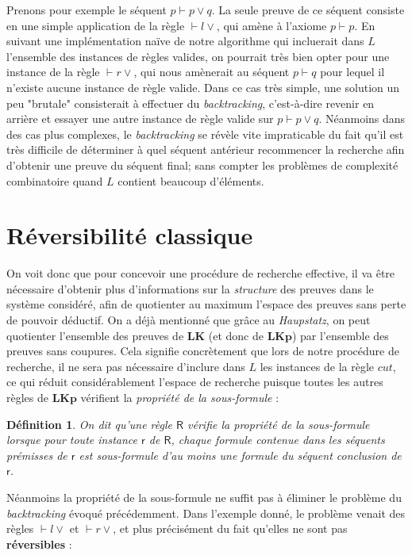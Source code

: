 \documentclass[12pt]{report}
\newcommand{\seq}{\vdash}
\newcommand{\irule}[1]{\footnotesize$#1$}
\newcommand{\iruleR}[1]{\irule{\seq{#1}}}
\newtheorem{definition}{Définition}
\begin{document}
Prenons pour exemple le séquent $p \seq p \lor q$. La seule preuve de ce séquent consiste en une simple application de la règle {\iruleR{l\lor}}, qui amène à l'axiome $p \seq p$. En suivant une implémentation naïve de notre algorithme qui incluerait dans $L$ l'ensemble des instances de règles valides, on pourrait très bien opter pour une instance de la règle {\iruleR{r\lor}}, qui nous amènerait au séquent $p \seq q$ pour lequel il n'existe aucune instance de règle valide. Dans ce cas très simple, une solution un peu "brutale" consisterait à effectuer du \emph{backtracking}, c'est-à-dire revenir en arrière et essayer une autre instance de règle valide sur $p \seq p \lor q$. Néanmoins dans des cas plus complexes, le \emph{backtracking} se révèle vite impraticable du fait qu'il est très difficile de déterminer à quel séquent antérieur recommencer la recherche afin d'obtenir une preuve du séquent final; sans compter les problèmes de complexité combinatoire quand $L$ contient beaucoup d'éléments.

\chapter*{Réversibilité classique}

On voit donc que pour concevoir une procédure de recherche effective, il va être nécessaire d'obtenir plus d'informations sur la \emph{structure} des preuves dans le système considéré, afin de quotienter au maximum l'espace des preuves sans perte de pouvoir déductif. On a déjà mentionné que grâce au \emph{Haupstatz}, on peut quotienter l'ensemble des preuves de $\mathbf{LK}$ (et donc de $\mathbf{LKp}$) par l'ensemble des preuves sans coupures. Cela signifie concrètement que lors de notre procédure de recherche, il ne sera pas nécessaire d'inclure dans $L$ les instances de la règle $cut$, ce qui réduit considérablement l'espace de recherche puisque toutes les autres règles de $\mathbf{LKp}$ vérifient la \emph{propriété de la sous-formule} :

\begin{definition}
    On dit qu'une règle $\mathsf{R}$ vérifie la \emph{propriété de la sous-formule} lorsque pour toute instance $\mathsf{r}$ de $\mathsf{R}$, chaque formule contenue dans les séquents prémisses de $\mathsf{r}$ est sous-formule d'au moins une formule du séquent conclusion de $\mathsf{r}$.
\end{definition}

Néanmoins la propriété de la sous-formule ne suffit pas à éliminer le problème du \emph{backtracking} évoqué précédemment. Dans l'exemple donné, le problème venait des règles {\iruleR{l\lor}} et {\iruleR{r\lor}}, et plus précisément du fait qu'elles ne sont pas \textbf{réversibles} :
\end{document}
